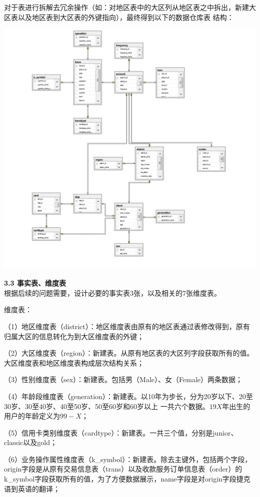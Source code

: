 \documentclass[a4paper]{article}
\begin{document}
\begin{enumerate}
  对于表进行拆解去冗余操作（如：对地区表中的大区列从地区表之中拆出，新建大区表以及地区表到大区表的外键指向），最终得到以下的数据仓库表
  结构：
  \begin{center}
    \includegraphics[scale=0.35]{Pictures/RELATION}
  \end{center}
  \medskip
  \textbf{3.3 事实表、维度表}\\
  \medskip
  根据后续的问题需要，设计必要的事实表3张，以及相关的7张维度表。

  维度表：

  （1）地区维度表（district）：地区维度表由原有的地区表通过表修改得到，原有归属大区的信息转化为到大区维度表的外键；

  （2）大区维度表（region）：新建表。从原有地区表的大区列字段获取所有的值。大区维度表和地区维度表构成层次结构关系；

  （3）性别维度表（sex）：新建表。包括男（Male）、女（Female）两条数据；

  （4）年龄段维度表（generation）：新建表。以10年为步长，分为20岁以下、20至30岁、30至40岁、40至50岁、50至60岁和60岁以上
  一共六个数据。$19X$年出生的用户的年龄定义为$99-X$；
  
  （5）信用卡类别维度表（cardtype）：新建表。一共三个值，分别是junior、classic以及gold；
  
  （6）业务操作属性维度表（k\_symbol）：新建表。除去主键外，包括两个字段，origin字段是从原有交易信息表（trans）以及收款服务订单信息表（order）的
  k\_symbol字段获取所有的值，为了方便数据展示，name字段是对origin字段捷克语到英语的翻译；
  

\end{enumerate}
\end{document}
